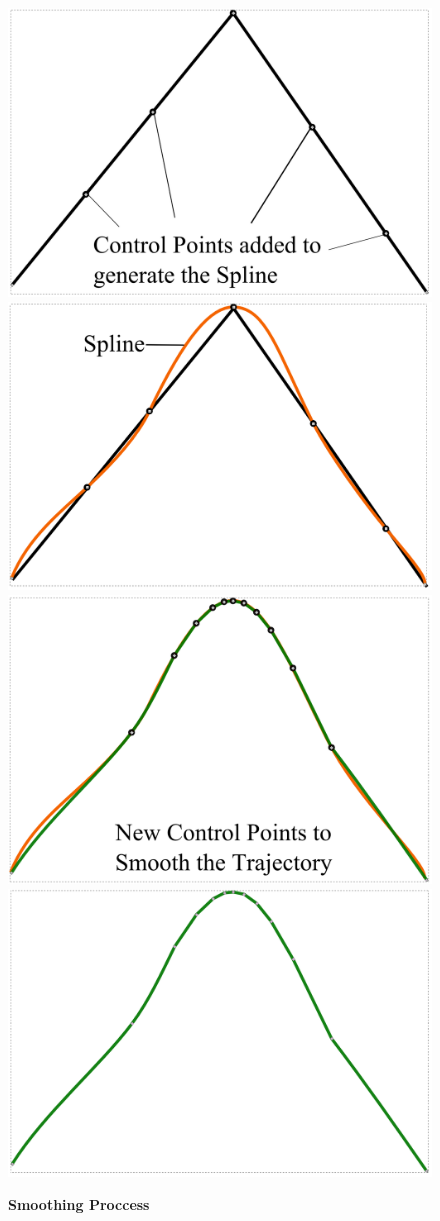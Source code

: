 \begin{figure}[t]
	\begin{center}
	\includegraphics[width=0.48\linewidth]{./images/Smooth1.png}
	\includegraphics[width=0.48\linewidth]{./images/Smooth2.png}\\
	\includegraphics[width=0.48\linewidth]{./images/Smooth3.png}
	\includegraphics[width=0.48\linewidth]{./images/Smooth4.png}
	\caption{
		\textbf{\textbf{Smoothing Proccess}}
	}
	\label{fig:smoothing}
	\end{center}
\end{figure}



